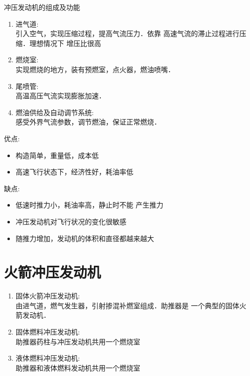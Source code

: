 冲压发动机的组成及功能
\begin{enumerate}
  \item 进气道:\\ 
    引入空气，实现压缩过程，提高气流压力．依靠
    高速气流的滞止过程进行压缩．理想情况下
    增压比很高
  \item 燃烧室:\\ 
    实现燃烧的地方，装有预燃室，点火器，燃油喷嘴．
  \item 尾喷管:\\ 
    高温高压气流实现膨胀加速．
  \item 燃油供给及自动调节系统:\\ 
    感受外界气流参数，调节燃油，保证正常燃烧．
\end{enumerate}

优点:
\begin{itemize}
  \item 构造简单，重量低，成本低
  \item 高速飞行状态下，经济性好，耗油率低
\end{itemize}

缺点:
\begin{itemize}
  \item 低速时推力小，耗油率高，静止时不能
    产生推力
  \item 冲压发动机对飞行状况的变化很敏感
  \item 随推力增加，发动机的体积和直径都越来越大
\end{itemize}

\section{火箭冲压发动机}
\begin{enumerate}
  \item 固体火箭冲压发动机:\\ 
    由进气道，燃气发生器，引射掺混补燃室组成．助推器是
    一个典型的固体火箭发动机．
  \item 固体燃料冲压发动机:\\ 
    助推器药柱与冲压发动机共用一个燃烧室
  \item 液体燃料冲压发动机:\\ 
    助推器和液体燃料发动机共用一个燃烧室
\end{enumerate}


